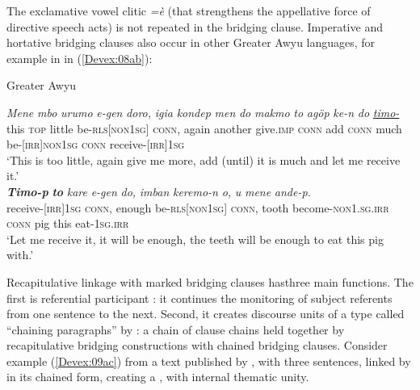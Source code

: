 \documentclass[output=paper]{LSP/langsci}
\begin{document}
The exclamative vowel clitic \textit{=è} (that strengthens the appellative force of directive speech acts) is not repeated in the bridging clause. Imperative and hortative bridging clauses also occur in other Greater Awyu languages, for example in  in (\ref{Devex:08ab}):



\begin{exe}
\ex \label{Devex:08ab}
 {} {Greater Awyu}
\begin{xlist}
\ex \label{Devex:08a}						
\gll \textit{Mene} \textit{mbo} \textit{urumo} \textit{e-gen} \textit{doro,} \textit{igia}	\textit{kondep}	\textit{men}	\textit{do} \textit{makmo} \textit{to}	\textit{agöp} \textit{ke-n} \textit{do} \underline{\textit{timo-}}\\
this \textsc{top} little be-\textsc{rls[non1sg]}	\textsc{conn}, again another give.\textsc{imp} \textsc{conn} add \textsc{conn} much be-\textsc{[irr]non1sg} \textsc{conn} receive-\textsc{[irr]1sg}\\
\glt `This is too little, again give me more, add (until) it is much and let me receive it.'\\

\ex \label{Devex:08b}						
\gll \textbf{\textit{Timo-p}} \textbf{\textit{to}} \textit{kare} \textit{e-gen} \textit{do,} \textit{imban}	\textit{keremo-n} \textit{o,}	\textit{u} \textit{mene} \textit{ande-p.}\\
receive-\textsc{[irr]1sg} \textsc{conn}, enough	be-\textsc{rls[non1sg]} \textsc{conn}, tooth become-\textsc{non1.sg.irr} \textsc{conn} pig this eat-\textsc{1sg.irr}\\
\glt `Let me receive it, it will be enough, the teeth will be enough to eat this pig with.'\\
\end{xlist}
\end{exe}

Recapitulative linkage with  marked bridging clauses has\linebreak three main functions. The first is referential participant  : it continues the  monitoring of subject referents from one sentence to the next. Second,  it  creates discourse units of a type called ``chaining paragraphs''  by \citet[][337--341]{farr99}: a chain of clause chains held together by recapitulative bridging constructions with chained bridging clauses. Consider example (\ref{Devex:09ac}) from a text published by \citet[][159--162]{enk97}, with three sentences, linked by  in its chained form, creating a , with internal thematic unity.
\end{document}
